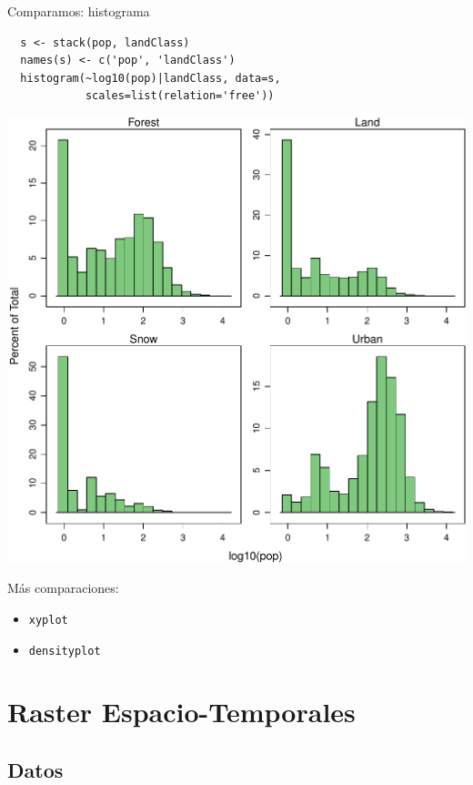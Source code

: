 \documentclass[xcolor={usenames,svgnames,dvipsnames}]{beamer}
\begin{document}
\begin{frame}[fragile,label=sec-3-3-2]{Comparamos: histograma}
 \lstset{language=R,label= ,caption= ,numbers=none}
\begin{lstlisting}
  s <- stack(pop, landClass)
  names(s) <- c('pop', 'landClass')
  histogram(~log10(pop)|landClass, data=s,
            scales=list(relation='free'))
\end{lstlisting}

\includegraphics[width=.9\linewidth]{figs/histogramLandClass.pdf}
\end{frame}

\begin{frame}[fragile,label=sec-3-3-3]{Más comparaciones:}
 \begin{itemize}
\item \texttt{xyplot}
\item \texttt{densityplot}
\end{itemize}
\end{frame}

\section{Raster Espacio-Temporales}
\label{sec-4}

\subsection{Datos}
\label{sec-4-1}
\end{document}

